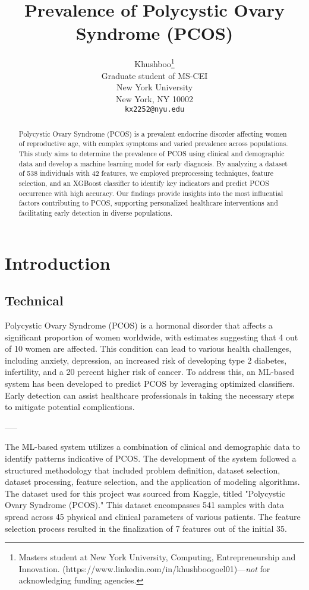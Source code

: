 \documentclass{article}
\title{Prevalence of 
Polycystic Ovary Syndrome 
(PCOS)}
\author{
  Khushboo\thanks{Masters student at New York University, Computing, Entrepreneurship and Innovation. (https://www.linkedin.com/in/khushboogoel01)---\emph{not} for acknowledging
    funding agencies.} \\
  Graduate student of MS-CEI\\
  New York University\\
  New York, NY 10002 \\
  \texttt{kx2252@nyu.edu} \\
}
\begin{document}
\maketitle

\begin{abstract}
  Polycystic Ovary Syndrome (PCOS) is a prevalent endocrine disorder affecting women of reproductive age, with complex symptoms and varied prevalence across populations. This study aims to determine the prevalence of PCOS using clinical and demographic data and develop a machine learning model for early diagnosis. By analyzing a dataset of 538 individuals with 42 features, we employed preprocessing techniques, feature selection, and an XGBoost classifier to identify key indicators and predict PCOS occurrence with high accuracy. Our findings provide insights into the most influential factors contributing to PCOS, supporting personalized healthcare interventions and facilitating early detection in diverse populations.
\end{abstract}


\section{Introduction}





\subsection{Technical}



Polycystic Ovary Syndrome (PCOS) is a hormonal disorder that affects a significant proportion of women worldwide, with estimates suggesting that 4 out of 10 women are affected. This condition can lead to various health challenges, including anxiety, depression, an increased risk of developing type 2 diabetes, infertility, and a 20 percent higher risk of cancer. To address this, an ML-based system has been developed to predict PCOS by leveraging optimized classifiers. Early detection can assist healthcare professionals in taking the necessary steps to mitigate potential complications.

-----

The ML-based system utilizes a combination of clinical and demographic data to identify patterns indicative of PCOS. The development of the system followed a structured methodology that included problem definition, dataset selection, dataset processing, feature selection, and the application of modeling algorithms. The dataset used for this project was sourced from Kaggle, titled "Polycystic Ovary Syndrome (PCOS)." This dataset encompasses 541 samples with data spread across 45 physical and clinical parameters of various patients. The feature selection process resulted in the finalization of 7 features out of the initial 35.
\end{document}
